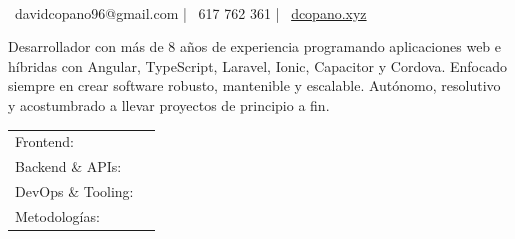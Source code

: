 \documentclass[]{awesome-cv}
\begin{document}
\begin{center}
	  \\
	\vspace{2mm}
	{\hspace{0.3cm}\faEnvelope\ davidcopano96@gmail.com}  |  {\faMobile\ 617 762 361}  |  {\faLink\ \href{https://dcopano.xyz}{dcopano.xyz}}
\end{center}

\begin{cventries}
	\cventry
	{}
	{Desarrollador con más de 8 años de experiencia programando aplicaciones web e híbridas con Angular, TypeScript, Laravel, Ionic, Capacitor y Cordova. Enfocado siempre en crear software robusto, mantenible y escalable. Autónomo, resolutivo y acostumbrado a llevar proyectos de principio a fin.}
	{}
	{}
	{}
\end{cventries}

\begin{cventries}
	\cventry
	{}
	{\def\arraystretch{1.2}{\begin{tabular}{ l l }
		Frontend: & {\skill{Angular, TypeScript, RxJS, Ionic, Capacitor, Cordova}} \\
		Backend \& APIs: & {\skill{Laravel/PHP, MySQL, REST APIs, JWT}} \\
		DevOps \& Tooling: & {\skill{Git, GitHub Actions, Docker, GitHub Copilot, VSCode}} \\
		Metodologías: & {\skill{Scrum, Kanban}} \\
	\end{tabular}}}
	{}
	{}
	{}
\end{cventries}
\vspace{-6mm}
\end{document}
